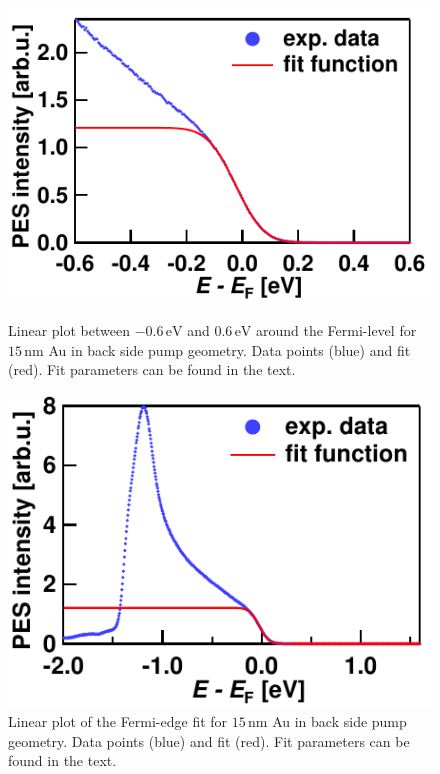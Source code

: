 \documentclass[a4paper,12pt,twoside]{article}
\begin{document}
	\begin{figure}[H]
		\begin{minipage}[t]{.475\linewidth}
			\includegraphics[width=\linewidth]{figures/insetfitbadupdate.pdf}
			\caption{Linear plot between $-0.6\,\mathrm{\mbox{eV}}$ and $0.6\,\mathrm{\mbox{eV}}$ around the Fermi-level for $15\,\mathrm{\mbox{nm}}$ Au in back side pump geometry. Data points (blue) and fit (red). Fit parameters can be found  in the text.}
        		\label{fitbad}
		\end{minipage}
	\hspace{.05\linewidth}
		\begin{minipage}[t]{.475\linewidth}
			\includegraphics[width=\linewidth]{figures/insetfitbad2update.pdf}
			\caption{Linear plot of the Fermi-edge fit for $15\,\mathrm{\mbox{nm}}$ Au in back side pump geometry. Data points (blue) and fit (red). Fit parameters can be found in the text.}
    			\label{fitbad2}
		\end{minipage}
	\end{figure}
\end{document}
